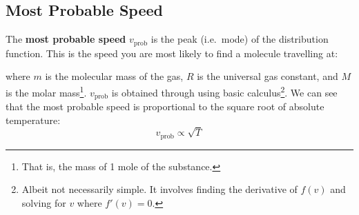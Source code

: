 %
%
%
%
\subsection{Most Probable Speed}
%  
%    
The \textbf{most probable speed} $v_\text{prob}$ is the peak (i.e.\ mode) of the
distribution function. This is the speed you are most likely to find a molecule
travelling at:
%
  
where $m$ is the molecular mass of the gas, $R$ is the universal gas constant,
and $M$ is the molar mass\footnote{That is, the mass of 1 mole of the
substance.}. $v_\text{prob}$ is obtained through using basic
calculus\footnote{Albeit not necessarily simple. It involves finding the
derivative of $f(v)$ and solving for $v$ where $f'(v)=0$.}. We can see that
the most probable speed is proportional to the square root of absolute
temperature:
\begin{equation}  
  v_\text{prob}\propto\sqrt T
\end{equation}

